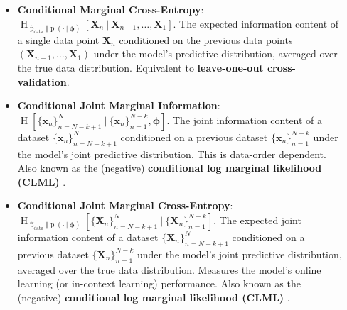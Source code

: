 \documentclass[25pt,a0paper,landscape]{tikzposter}
\newcommand{\MidSymbol}[1][]{\:#1\:}
\newcommand{\given}{\MidSymbol[\vert]}
\DeclareMathOperator{\opEntropy}{H}
\newcommand{\Hof}[1]{\opEntropy[#1]}
\newcommand{\iCrossEntropy}[3]{\opEntropy_{#1 \Vert #2}[#3]}
\DeclareMathOperator{\opp}{p}
\newcommand{\pof}[1]{\opp(#1)}
\newcommand{\h}{\boldsymbol{\phi}}
\newcommand{\XNsetk}{\{\X_n\}_{n=N-k+1}^N}
\newcommand{\xNsetk}{\{\x_n\}_{n=N-k+1}^N}
\newcommand{\XNkset}{\{\X_n\}_{n=1}^{N-k}}
\newcommand{\xNkset}{\{\x_n\}_{n=1}^{N-k}}
\newcommand{\x}{\boldsymbol{x}}
\newcommand{\X}{\boldsymbol{X}}
\newcommand{\oppdata}{\hat{\opp}_{\text{data}}}
\begin{document}
\begin{columns}
{\begin{itemize}
        \item \textbf{Conditional Marginal Cross-Entropy}: $\iCrossEntropy{\oppdata}{\pof{\cdot \given \h}}{\X_n \given \X_{n-1}, \ldots, \X_1}$.
        The expected information content of a single data point $\X_n$ conditioned on the previous data points $(\X_{n-1}, \ldots, \X_1)$ under the model's predictive distribution, averaged over the true data distribution. Equivalent to \textbf{leave-one-out cross-validation}.
        \item \textbf{Conditional Joint Marginal Information}: $\Hof{\xNsetk \given \xNkset, \h}$.
        The joint information content of a dataset $\xNsetk$ conditioned on a previous dataset $\xNkset$ under the model's joint predictive distribution. This is data-order dependent. Also known as the (negative) \textbf{conditional log marginal likelihood (CLML)} \citep[main paper]{lotfi2022bayesian}.
        \item \textbf{Conditional Joint Marginal Cross-Entropy}: $\iCrossEntropy{\oppdata}{\pof{\cdot \given \h}}{\XNsetk \given \XNkset}$.
        The expected joint information content of a dataset $\XNsetk$ conditioned on a previous dataset $\XNkset$ under the model's joint predictive distribution, averaged over the true data distribution. Measures the model's online learning (or in-context learning) performance. Also known as the (negative) \textbf{conditional log marginal likelihood (CLML)} \citep[appendix]{lotfi2022bayesian}.
      \end{itemize}
  }
  {
    }
\end{columns}
\end{document}
